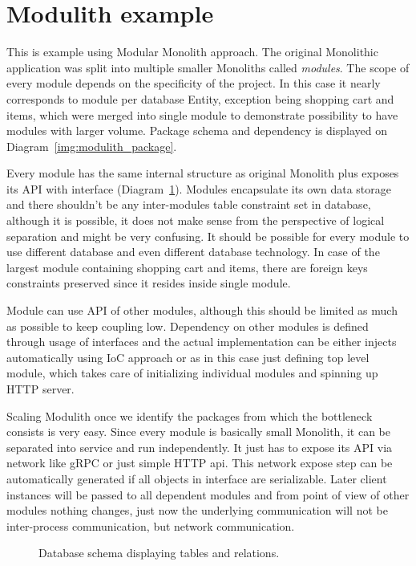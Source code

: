 \section{Modulith example}
This is example using Modular Monolith approach. The original Monolithic application was split into multiple smaller Monoliths called \textit{modules}. The scope of every module depends on the specificity of the project. In this case it nearly corresponds to module per database Entity, exception being shopping cart and items, which were merged into single module to demonstrate possibility to have modules with larger volume. Package schema and dependency is displayed on Diagram~\ref{img:modulith_package}.

Every module has the same internal structure as original Monolith plus exposes its API with interface (Diagram~\ref{img:modulith_module_package}). Modules encapsulate its own data storage and there shouldn't be any inter-modules table constraint set in database, although it is possible, it does not make sense from the perspective of logical separation and might be very confusing. It should be possible for every module to use different database and even different database technology. In case of the largest module containing shopping cart and items, there are foreign keys constraints preserved since it resides inside single module.

Module can use API of other modules, although this should be limited as much as possible to keep coupling low. Dependency on other modules is defined through usage of interfaces and the actual implementation can be either injects automatically using IoC approach or as in this case just defining top level module, which takes care of initializing individual modules and spinning up HTTP server.

Scaling Modulith once we identify the packages from which the bottleneck consists is very easy. Since every module is basically small Monolith, it can be separated into service and run independently. It just has to expose its API via network like gRPC or just simple HTTP api. This network expose step can be automatically generated if all objects in interface are serializable. Later client instances will be passed to all dependent modules and from point of view of other modules nothing changes, just now the underlying communication will not be inter-process communication, but network communication.

\begin{figure}
    \centering
    
    \caption{Database schema displaying tables and relations. \label{img:modulith_module_package}}
\end{figure}

